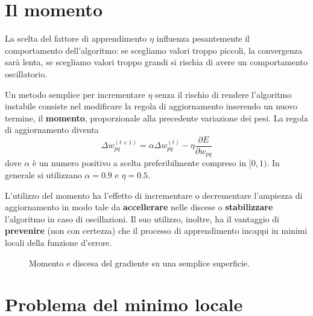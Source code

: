 \section{Il momento}
\label{sub:il_momento}

La scelta del fattore di apprendimento $\eta$ influenza pesantemente il comportamento dell'algoritmo: se scegliamo valori troppo piccoli, la convergenza sarà lenta, se scegliamo valori troppo grandi si rischia di avere un comportamento oscillatorio.

Un metodo semplice per incrementare $\eta$ senza il rischio di rendere l'algoritmo instabile consiste nel modificare la regola di aggiornamento inserendo un nuovo termine, il \textbf{momento}, proporzionale alla precedente variazione dei pesi. La regola di aggiornamento diventa
\begin{displaymath}
	\Delta w_{pq}^{(t + 1)} = \alpha \Delta w_{pq}^{(t)} - \eta \frac{\partial E}{\partial w_{pq}}
\end{displaymath}
dove $\alpha$ è un numero positivo a scelta preferibilmente compreso in $[0,1)$. In generale si utilizzano $\alpha = 0.9$ e $\eta = 0.5$.

L'utilizzo del momento ha l'effetto di incrementare o decrementare l'ampiezza di aggiornamento in modo tale da \textbf{accellerare} nelle discese o \textbf{stabilizzare} l'algoritmo in caso di oscillazioni. Il suo utilizzo, inoltre, ha il vantaggio di \textbf{prevenire} (non con certezza) che il processo di apprendimento incappi in minimi locali della funzione d'errore.

\begin{figure}[h!]
	\centering
	\qquad
	\caption{Momento e discesa del gradiente su una semplice superficie.}
\end{figure}

\section{Problema del minimo locale}
\label{sec:problema_del_minimo_locale}

